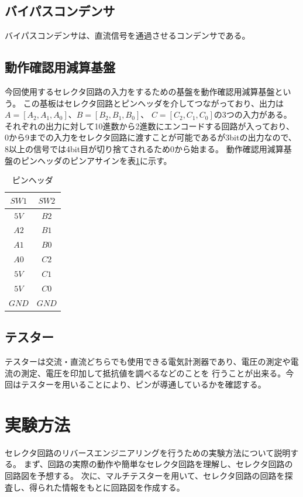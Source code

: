 \documentclass[a4paper,11pt,dvipdfmx]{jsarticle}
\begin{document}
\subsection{バイパスコンデンサ}
バイパスコンデンサは、直流信号を通過させるコンデンサである。

\subsection{動作確認用減算基盤}
今回使用するセレクタ回路の入力をするための基盤を動作確認用減算基盤という。
この基板はセレクタ回路とピンヘッダを介してつながっており、出力は$A= [A_2, A_1, A_0]$、$B = [B_2, B_1, B_0]$、
$C = [C_2, C_1, C_0]$の3つの入力がある。それぞれの出力に対して10進数から2進数にエンコードする回路が入っており、
0から9までの入力をセレクタ回路に渡すことが可能であるが3bitの出力なので、8以上の信号では4bit目が切り捨てされるため0から始まる。
動作確認用減算基盤のピンヘッダのピンアサインを表\ref{tab:pin}に示す。
\begin{table}[H]
  \centering
  \caption{ピンヘッダ}
  \label{tab:pin}
  \begin{tabular}{|c|c|}
    \hline
    $SW1$  & $SW2$  \\
    \hline
    $5V$ & $B2$ \\
    $A2$ & $B1$ \\
    $A1$ & $B0$ \\
    $A0$ & $C2$ \\
    $5V$ & $C1$ \\
    $5V$ & $C0$ \\
    $GND$ & $GND$ \\
    \hline
  \end{tabular}
\end{table}

\subsection{テスター}
テスターは交流・直流どちらでも使用できる電気計測器であり、電圧の測定や電流の測定、電圧を印加して抵抗値を調べるなどのことを
行うことが出来る。今回はテスターを用いることにより、ピンが導通しているかを確認する。

\section{実験方法}
セレクタ回路のリバースエンジニアリングを行うための実験方法について説明する。
まず、回路の実際の動作や簡単なセレクタ回路を理解し、セレクタ回路の回路図を予想する。
次に、マルチテスターを用いて、セレクタ回路の回路を探査し、得られた情報をもとに回路図を作成する。
\end{document}
